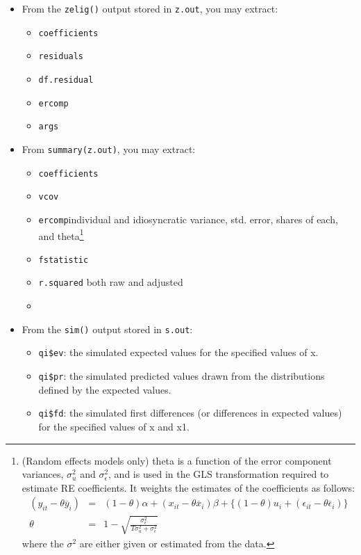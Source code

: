 \begin{itemize}
\item From the {\tt zelig()} output stored in {\tt z.out}, you may
extract:
\begin{itemize}
\item	\texttt{coefficients}
\item	\texttt{residuals}
\item	\texttt{df.residual}
\item	\texttt{ercomp}
\item	\texttt{args}
\end{itemize}
\item From {\tt summary(z.out)}, you may extract:
\begin{itemize}
\item	\texttt{coefficients}
\item	\texttt{vcov}
\item	\texttt{ercomp}individual and idiosyncratic variance, std. error, shares of each, and theta\footnote{(Random effects models only) theta is a function of the error component variances, \(\sigma^2_u\) and \(\sigma^2_\epsilon\), and is used in the GLS transformation required to estimate RE coefficients. It weights the estimates of the coefficients as follows:
\begin{eqnarray*}(y_{it}-\theta\overline{y}_i)	&	=	& (1-\theta)\alpha + (x_{it}-\theta\overline{x}_i)\beta + \{(1-\theta)u_i + (\epsilon_{it}-\theta\overline{\epsilon}_i)\} \\
\theta	&	=	&	1- \sqrt{\frac{\sigma^2_\epsilon}{T\sigma^2_u+\sigma^2_\epsilon}}
\end{eqnarray*}
where the \(\sigma^2\) are either given or estimated from the data.
}
\item	\texttt{fstatistic}
\item	\texttt{r.squared} both raw and adjusted
\item	\texttt{} 
\end{itemize}
\item From the {\tt sim()} output stored in {\tt s.out}:
\begin{itemize}
\item	\texttt{qi\$ev}: the simulated expected values for the specified values of x.
\item	\texttt{qi\$pr}: the simulated predicted values drawn from the distributions defined by the expected values.
\item	\texttt{qi\$fd}: the simulated first differences (or differences in expected values) for the specified values of x and x1.
\end{itemize}
\end{itemize}


